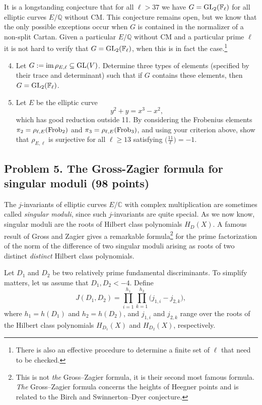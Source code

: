 \documentclass[11pt]{article}
\newcommand{\F}{\mathbb{F}}
\newcommand{\Q}{\mathbb{Q}}
\newcommand{\C}{\mathbb{C}}
\newcommand{\GL}{{\rm GL}}
\newcommand{\kron}[2]{\bigl(\frac{#1}{#2}\bigr)}
\newcommand{\im}{\operatorname{im}}
\newcommand{\Frob}{{\rm Frob}}
\begin{document}
It is a longstanding conjecture that for all $\ell > 37$ we have $G=\GL_2(\F_\ell)$ for all elliptic curves $E/\Q$ without CM.  This conjecture remains open, but we know that the only possible exceptions occur when $G$ is contained in the normalizer of a non-split Cartan.  Given a particular $E/\Q$ without CM and a particular prime $\ell$ it is not hard to verify that $G=\GL_2(\F_\ell)$, when this is in fact the case.\footnote{There is also an effective procedure to determine a finite set of $\ell$ that need to be checked.}


\begin{enumerate}[{\bf(a)}]
\setcounter{enumi}{3}
\item Let $G := \im\rho_{E, \ell}\subseteq \GL(V)$.  Determine three types of elements (specified by their trace and determinant) such that if $G$ contains these elements, then $G = \GL_2(\F_\ell)$.

\item Let $E$ be the elliptic curve 
\[
y^2 + y = x^3 - x^2,
\]
which has good reduction outside 11.
By considering the Frobenius elements $\pi_2 = \rho_{\ell, E}(\Frob_2)$ and $\pi_3 = \rho_{\ell, E}(\Frob_3)$, and using your criterion above, show that $\rho_{E, \ell}$ is surjective for all $\ell \geq 13$ satisfying $\kron{11}{\ell} = -1$.
\end{enumerate}

\subsection*{Problem 5. The Gross-Zagier formula for singular moduli (98 points)}
The $j$-invariants of elliptic curves $E/\C$ with complex multiplication are sometimes called \emph{singular moduli}, since such $j$-invariants are quite special.
As we now know, singular moduli are the roots of Hilbert class polynomials $H_D(X)$.
A famous result of Gross and Zagier \cite{GZ} gives a remarkable formula\footnote{This is not \emph{the} Gross--Zagier formula, it is their second most famous formula.  \emph{The} Gross--Zagier formula concerns the heights of Heegner points and is related to the Birch and Swinnerton--Dyer conjecture.} for the prime factorization of the norm of the difference of two singular moduli arising as roots of two distinct \emph{distinct} Hilbert class polynomials.

Let $D_1$ and $D_2$ be two relatively prime fundamental discriminants.  To simplify matters, let us assume that $D_1,D_2<-4$.
Define
\[
J(D_1,D_2) = \prod_{i=1}^{h_1}\prod_{k=1}^{h_2}\bigl(j_{1,i}-j_{2,k}\bigr),
\]
where $h_1=h(D_1)$ and $h_2=h(D_2)$, and $j_{1,i}$ and $j_{2,k}$ range over the roots of the Hilbert class polynomials $H_{D_1}(X)$ and $H_{D_2}(X)$, respectively.
\end{document}
